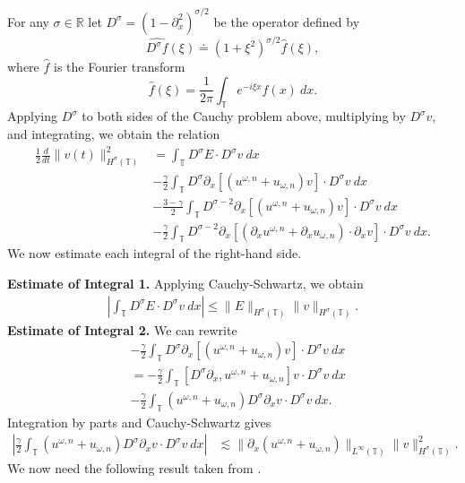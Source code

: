 \documentclass{beamer}
\newcommand{\rr}{\mathbb{R}}
\newcommand{\p}{\partial}
\newcommand{\ci}{\mathbb{T}}
\begin{document}
\begin{frame}
	For any $\sigma \in \rr$ let   $D^\sigma=(1-\p_x^2)^{\sigma/2}$ be the  operator
defined by 
%
$$ \widehat{D^\sigma f}(\xi) \doteq (1 + \xi^2)^{\sigma/2} \widehat{f}(\xi), $$
%
where $ \widehat{f}$ is the Fourier transform
%
$$ \widehat{f}(\xi) =  \frac{1}{2\pi}\int_{\ci} e^{-i \xi x} f(x) \ dx.  $$
%
%
Applying $D^\sigma$ to both sides of the Cauchy problem above, multiplying by
$D^\sigma v$, and integrating, we obtain the
relation
%
%
\begin{equation*}
\begin{split}
\frac{1}{2}\frac{d}{dt}\|v(t)\|_{H^\sigma(\ci)}^2
& = \int_{\ci} D^\sigma E \cdot D^\sigma
v \ dx
\\
&-
 \frac{\gamma}{2}\int_{\ci} D^\sigma
\p_x \left[ \left( u^{\omega,n} + u_{\omega,n} \right)v
\right]\cdot D^\sigma v \ dx
\\
& -
 \frac{3-\gamma}{2}\int_{\ci} D^{\sigma
-2} \p_x \left[ \left( u^{\omega,n} + u_{\omega,n}
\right)v \right] \cdot D^\sigma v \ dx
\\
& - \frac{\gamma}{2}\int_{\ci} D^{\sigma
-2}
\p_x \left[ \left( \p_x u^{\omega,n} + \p_x u_{\omega,n}
\right)\cdot \p_x v \right] \cdot
D^\sigma v \ dx.
\label{X}
\end{split}
\end{equation*}
%
%
We now estimate each integral of the right-hand side.
\end{frame}
%
%
\begin{frame}

{\bf Estimate of Integral 1.} Applying Cauchy-Schwartz, we obtain
%
%
\begin{equation*}
\begin{split}
\left |\int_{\ci} D^\sigma E \cdot D^\sigma v \ dx \right |
 \le \|E\|_{H^\sigma(\ci)} \|v\|_{H^\sigma(\ci)}.
\label{est_for_1}
\end{split}
\end{equation*}
%
%
%
\pause
%
%
{\bf Estimate of Integral 2.} We can rewrite
%
%
\begin{equation*}
\begin{split}
& -\frac{\gamma}{2} \int_{\ci} D^\sigma \p_x \left[ \left( u^{\omega,n} + 
u_{\omega,n}
\right)v \right] \cdot D^\sigma v \ dx
 \\
 & = -\frac{\gamma}{2}\int_{\ci} \left[ D^\sigma \p_x , u^{\omega,n} + 
u_{\omega,n}
\right]v \cdot D^\sigma v \ dx
\\
& - \frac{\gamma}{2} \int_{\ci} (u^{\omega,n} + u_{\omega,n})
D^\sigma \p_x v \cdot
D^\sigma v \ dx.
\label{est_for_2}
\end{split}
\end{equation*}
%
%
Integration 
by parts and Cauchy-Schwartz gives 
%
%
\begin{equation*}
\begin{split}
\left | \frac{\gamma}{2} \int_{\ci} (u^{\omega,n} + u_{\omega,n})
D^\sigma \p_x v \cdot
D^\sigma v \ dx \right |
& \lesssim \|\p_x(u^{\omega,n} + u_{\omega,n}) \|_{L^\infty(\ci)}
\|v\|_{H^\sigma(\ci)}^2.
\label{2'}
\end{split}
\end{equation*}
%
%
 We now need the following result
 taken from \cite{Taylor_2003_Commutator-esti}.
%
\end{frame}
\end{document}
